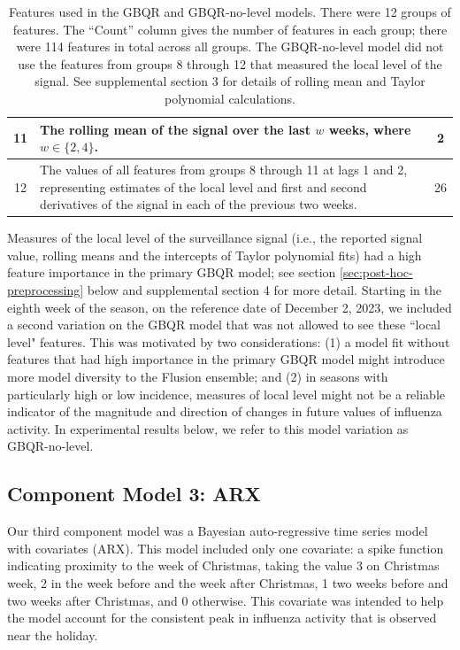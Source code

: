 \documentclass{article}\usepackage[]{graphicx}\usepackage[]{xcolor}
\begin{document}
\begin{table}[htbp]
\begin{tabular}{cp{11cm}c}
\midrule
11 & The rolling mean of the signal over the last $w$ weeks, where $w \in \{2, 4\}$. & 2 \\
\midrule
12 & The values of all features from groups 8 through 11 at lags 1 and 2, representing estimates of the local level and first and second derivatives of the signal in each of the previous two weeks. & 26 \\
\bottomrule
\end{tabular}
\caption{Features used in the GBQR and GBQR-no-level models. There were 12 groups of features. The ``Count'' column gives the number of features in each group; there were 114 features in total across all groups. The GBQR-no-level model did not use the features from groups 8 through 12 that measured the local level of the signal. See supplemental section 3 for details of rolling mean and Taylor polynomial calculations.}
\label{tab:features}
\end{table}

Measures of the local level of the surveillance signal (i.e., the reported signal value, rolling means and the intercepts of Taylor polynomial fits) had a high feature importance in the primary GBQR model; see section \ref{sec:post-hoc-preprocessing} below and supplemental section 4 for more detail.  Starting in the eighth week of the season, on the reference date of December 2, 2023, we included a second variation on the GBQR model that was not allowed to see these ``local level" features. This was motivated by two considerations: (1) a model fit without features that had high importance in the primary GBQR model might introduce more model diversity to the Flusion ensemble; and (2) in seasons with particularly high or low incidence, measures of local level might not be a reliable indicator of the magnitude and direction of changes in future values of influenza activity. In experimental results below, we refer to this model variation as GBQR-no-level.

\subsection{Component Model 3: ARX}
\label{subsec:model_arx}

Our third component model was a Bayesian auto-regressive time series model with covariates (ARX). This model included only one covariate: a spike function indicating proximity to the week of Christmas, taking the value 3 on Christmas week, 2 in the week before and the week after Christmas, 1 two weeks before and two weeks after Christmas, and 0 otherwise. This covariate was intended to help the model account for the consistent peak in influenza activity that is observed near the holiday.
\end{document}
